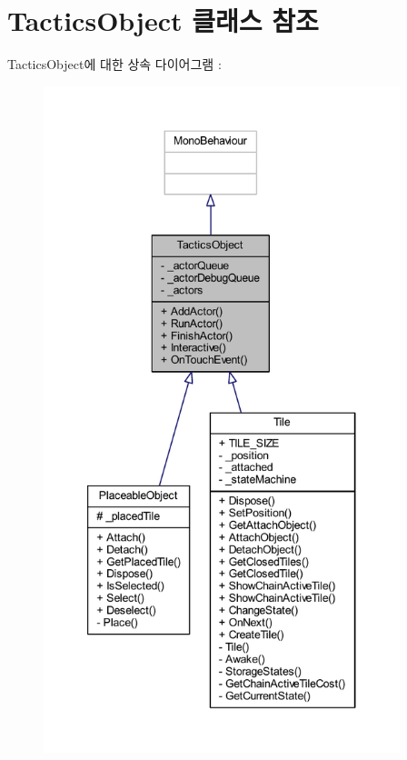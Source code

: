 \hypertarget{class_tactics_object}{}\section{Tactics\+Object 클래스 참조}
\label{class_tactics_object}


Tactics\+Object에 대한 상속 다이어그램 \+: \nopagebreak
\begin{figure}[H]
\begin{center}
\leavevmode
\includegraphics[height=550pt]{class_tactics_object__inherit__graph}
\end{center}
\end{figure}


